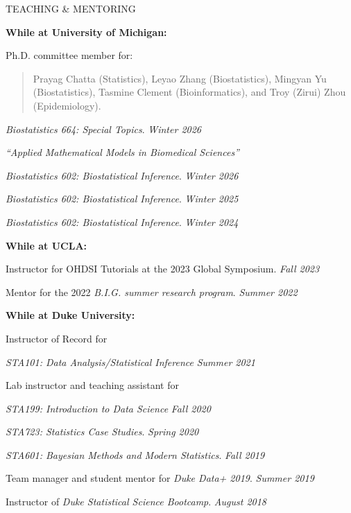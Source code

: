 \documentclass{resume} %
\begin{document}
\begin{rSection}{TEACHING \& MENTORING}
	
\hspace*{-0.2in}\textbf{While at University of Michigan:}

Ph.D.  committee member for: 

\begin{quote}
	Prayag Chatta (Statistics), Leyao Zhang (Biostatistics),  Mingyan Yu (Biostatistics), Tasmine Clement (Bioinformatics), and Troy (Zirui) Zhou (Epidemiology). 
\end{quote}
	
	\emph{Biostatistics 664: Special Topics}. \hfill {\em Winter 2026}
	
	 \vspace*{-0.1in}
	\emph{``Applied Mathematical Models in Biomedical Sciences''}
	
	
	\emph{Biostatistics 602: Biostatistical Inference}.  \hfill {\em Winter 2026}

    \emph{Biostatistics 602: Biostatistical Inference}.  \hfill {\em Winter 2025}


 \emph{Biostatistics 602: Biostatistical Inference}.  \hfill {\em Winter 2024}

\smallskip 

\hspace*{-0.2in}\textbf{While at UCLA:}
	
	Instructor for OHDSI Tutorials at the 2023 Global Symposium.  \hfill {\em Fall 2023}
		
	Mentor for the 2022 \emph{B.I.G. summer research program}.  \hfill {\em Summer 2022}
	
\smallskip 
	
\hspace*{-0.2in}\textbf{While at Duke University:}
	
	Instructor of Record for 
	
		\hspace{0.2in} \emph{STA101: Data Analysis/Statistical Inference} \hfill {\em Summer 2021}
	
	Lab instructor and teaching assistant for 
	
	\hspace{0.2in} \emph{STA199: Introduction to Data Science} \hfill {\em Fall 2020}
	
	\hspace{0.2in} \emph{STA723: Statistics Case Studies}. \hfill {\em Spring 2020}
	
	\hspace{0.2in} \emph{STA601: Bayesian Methods and Modern Statistics}. \hfill {\em Fall 2019}
	
	
	Team manager and student mentor for \emph{Duke Data+ 2019}. \hfill {\em Summer 2019}
	
	Instructor of \emph{Duke Statistical Science Bootcamp}. \hfill {\em August 2018}
\end{rSection}
\end{document}
